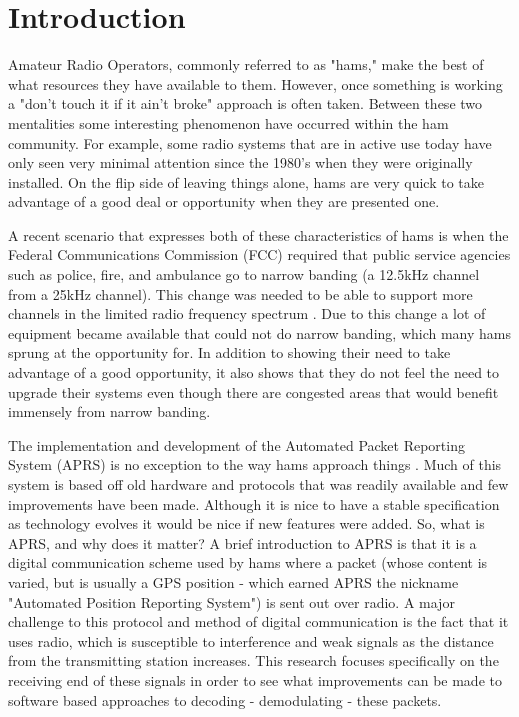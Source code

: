 \chapter{Introduction}

Amateur Radio Operators, commonly referred to as "hams," make the best of what resources they have available to them. However, once something is working a "don't touch it if it ain't broke" approach is often taken. Between these two mentalities some interesting phenomenon have occurred within the ham community. For example, some radio systems that are in active use today have only seen very minimal attention since the 1980's when they were originally installed. On the flip side of leaving things alone, hams are very quick to take advantage of a good deal or opportunity when they are presented one.

A recent scenario that expresses both of these characteristics of hams is when the Federal Communications Commission (FCC) required that public service agencies such as police, fire, and ambulance go to narrow banding (a 12.5kHz channel from a 25kHz channel). This change was needed to be able to support more channels in the limited radio frequency spectrum \cite{Commission2012}. Due to this change a lot of equipment became available that could not do narrow banding, which many hams sprung at the opportunity for. In addition to showing their need to take advantage of a good opportunity, it also shows that they do not feel the need to upgrade their systems even though there are congested areas that would benefit immensely from narrow banding.

The implementation and development of the Automated Packet Reporting System (APRS) is no exception to the way hams approach things \cite{Bruninga}. Much of this system is based off old hardware and protocols that was readily available and few improvements have been made. Although it is nice to have a stable specification as technology evolves it would be nice if new features were added. So, what is APRS, and why does it matter? A brief introduction to APRS is that it is a digital communication scheme used by hams where a packet (whose content is varied, but is usually a GPS position - which earned APRS the nickname "Automated Position Reporting System") is sent out over radio. A major challenge to this protocol and method of digital communication is the fact that it uses radio, which is susceptible to interference and weak signals as the distance from the transmitting station increases. This research focuses specifically on the receiving end of these signals in order to see what improvements can be made to software based approaches to decoding - demodulating - these packets.

